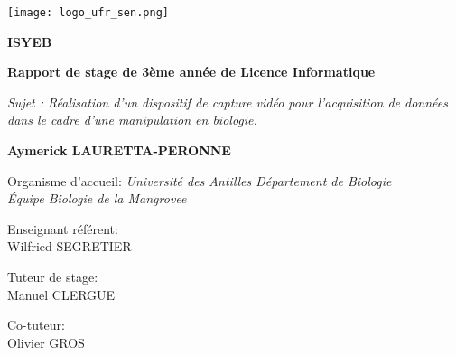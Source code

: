 \begin{titlepage}
    \begin{center}
        \vspace*{1cm}

        \texttt{[image: logo\_ufr\_sen.png]}
        \hspace{2cm}

        \vspace{0.5cm}

        \textbf{\Huge{ISYEB}}

        \vspace{0.5cm}

        \textbf{Rapport de stage de 3ème année de Licence Informatique} 
        
        \vspace{0.3cm}

        \small{\textit{Sujet : Réalisation d'un dispositif de capture vidéo pour l’acquisition de données dans le cadre d’une manipulation en biologie.}}

        \vspace{1.5cm}

        \textbf{Aymerick LAURETTA-PERONNE} \\

        \vfill
                
		{\large Organisme d'accueil: \textsl{Université des Antilles Département de Biologie}} \\[0.1cm]
        \small{\textit{Équipe Biologie de la Mangrovee}} \\[1.5cm]

		\begin{minipage}{0.7\textwidth}
			\begin{flushleft}
				Enseignant référent: \\
				\hspace{0.2cm} Wilfried \textsc{SEGRETIER}
			\end{flushleft}
		\end{minipage}
        
		\vspace{-0.85cm}
		\hspace{9cm}
		\begin{minipage}{0.3\textwidth}
			\begin{flushleft}
				Tuteur de stage: \\
				\hspace{0.2cm} Manuel \textsc{CLERGUE}

				Co-tuteur: \\
				\hspace{0.2cm} Olivier \textsc{GROS}
			\end{flushleft}
		\end{minipage} \\[3cm]
        

\end{center}
\end{titlepage}
